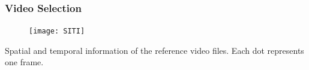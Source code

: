 \begin{frame}
\frametitle{Video Selection}

\begin{figure}[hbt!]
	\centering
	\texttt{[image: SITI]}
\end{figure}

Spatial and temporal information of the reference video files.
\newline Each dot represents one frame.


\end{frame}


